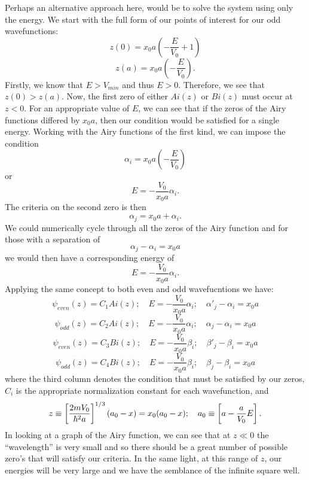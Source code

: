 \documentclass[11pt,letterpaper]{article}
\begin{document}
\begin{enumerate}
\begin{enumerate}
Perhaps an alternative approach here, would be to solve the system using only the energy. We start with the full form of our points of interest for our odd wavefunctions:
$$z(0) = x_0a\left(-\frac{E}{V_0}+1\right)$$
$$z(a) = x_0a\left(-\frac{E}{V_0}\right).$$
Firstly, we know that $E>V_{min}$ and thus $E>0$. Therefore, we see that $z(0)>z(a)$. Now, the first zero of either $Ai(z)$ or $Bi(z)$ must occur at $z<0$. For an appropriate value of $E$, we can see that if the zeros of the Airy functions differed by $x_0a$, then our condition would be satisfied for a single energy. Working with the Airy functions of the first kind, we can impose the condition
$$\alpha_i = x_0a\left(-\frac{E}{V_0}\right)$$
or
$$E = -\frac{V_0}{x_0a}\alpha_i.$$
The criteria on the second zero is then
$$\alpha_j = x_0a+\alpha_i.$$
We could numerically cycle through all the zeros of the Airy function and for those with a separation of
$$\alpha_j-\alpha_i=x_0a$$
we would then have a corresponding energy of
$$E = -\frac{V_0}{x_0a}\alpha_i.$$
Applying the same concept to both even and odd wavefucntions we have:
$$\psi_{even}(z) = C_1Ai(z);\quad E = -\frac{V_0}{x_0a}\alpha_i;\quad\alpha'_j -\alpha_i= x_0a$$
$$\psi_{odd}(z) = C_2Ai(z);\quad E = -\frac{V_0}{x_0a}\alpha_i;\quad\alpha_j -\alpha_i= x_0a$$
$$\psi_{even}(z) = C_3Bi(z);\quad E = -\frac{V_0}{x_0a}\beta_i;\quad\beta'_j -\beta_i= x_0a$$
$$\psi_{odd}(z) = C_4Bi(z);\quad E = -\frac{V_0}{x_0a}\beta_i;\quad\beta_j -\beta_i= x_0a$$
where the third column denotes the condition that must be satisfied by our zeros, $C_i$ is the appropriate normalization constant for each wavefunction, and
$$z\equiv \left[\frac{2mV_0}{\hbar^2a}\right]^{1/3}(a_0-x)=x_0(a_0-x);\quad a_0 \equiv \left[a-\frac{a}{V_0}E\right].$$
In looking at a graph of the Airy function, we can see that at $z\ll 0$ the ``wavelength'' is very small and so there should be a great number of possible zero's that will satisfy our criteria. In the same light, at this range of $z$, our energies will be very large and we have the semblance of the infinite square well. 


\end{enumerate}
\end{enumerate}
\end{document}
